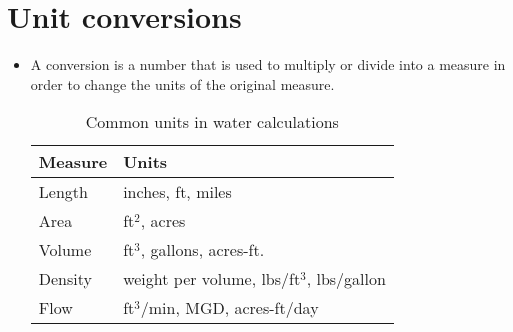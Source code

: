 \section{Unit conversions}
\begin{itemize}
\item A conversion is a number that is used to multiply or divide into a measure in order to change the units of the original measure.

\begin{table}[h!]

\begin{center}
    \begin{tabular}{ | p{4cm} |p{8cm}|}
    \hline
    
\textbf{Measure} & \textbf{Units}\\
\hline   
Length  & inches, ft, miles\\
\hline 
Area  & ft$^2$, acres \\
\hline 
Volume & ft$^3$, gallons, acres-ft.\\
\hline 
Density & weight per volume, lbs/ft$^3$, lbs/gallon\\
\hline 
Flow & ft$^3$/min, MGD, acres-ft/day\\
\hline 

	

    \end{tabular}
 \caption{Common units in water calculations}	
    \end{center}

    \end{table}


\end{itemize}
